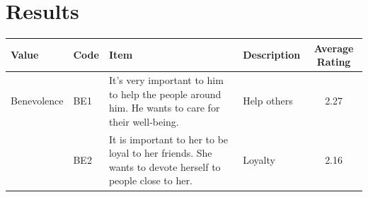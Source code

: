 \documentclass[12pt,letter]{article}\usepackage[]{graphicx}\usepackage[]{xcolor}
\begin{document}
\section*{Results}


\begin{table}
\centering
\renewcommand{\arraystretch}{1.25}
\scriptsize
\begin{tabularx}{\linewidth}{llXlc} 
\toprule
\textbf{Value} & \textbf{Code} & \textbf{Item} &  \textbf{Description} & \textbf{Average Rating} \\
\midrule
Benevolence & BE1 &  It's very important to him to help the people around him. He wants to care for their well-being.
      &  Help others & 2.27 \\[0.5em]
    
      & BE2 & It is important to her to be loyal to her friends. She wants to devote herself to people close to her.
      &  Loyalty & 2.16 \\[0.5em] \midrule
    

\end{tabularx}
\end{table}
\end{document}
